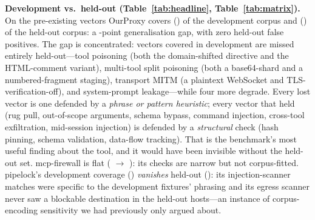 \documentclass[conference]{IEEEtran}
\newcommand{\proxy}{OurProxy}
\newcommand{\rev}{2026-07-28}
\begin{document}
\begin{table}[t]
\caption{Per-vector coverage. E~=~enforce, D~=~detect, --~=~none; the number is the vector's CorpusRobustCoverage in percent. $\Delta$ is held-out minus development for \proxy. $^{\dagger}$Vectors introduced by \rev{} have no held-out set yet (rule~7).}
\label{tab:matrix}
\centering\scriptsize

\end{table}

\textbf{Development vs.\ held-out (Table~\ref{tab:headline}, Table~\ref{tab:matrix}).} On the \nOrig{} pre-existing vectors \proxy{} covers \bastDevOrig{} (\bastDevOrigFrac) of the development corpus and \bastHeldout{} (\bastHeldoutFrac) of the held-out corpus: a \bastGap-point generalisation gap, with zero held-out false positives. The gap is concentrated: \bastLostVectors{} vectors covered in development are missed entirely held-out---tool poisoning (both the domain-shifted directive and the HTML-comment variant), multi-tool split poisoning (both a base64-shard and a numbered-fragment staging), transport MITM (a plaintext WebSocket and TLS-verification-off), and system-prompt leakage---while four more degrade. Every lost vector is one defended by a \emph{phrase or pattern heuristic}; every vector that held (rug pull, out-of-scope arguments, schema bypass, command injection, cross-tool exfiltration, mid-session injection) is defended by a \emph{structural} check (hash pinning, schema validation, data-flow tracking). That is the benchmark's most useful finding about the tool, and it would have been invisible without the held-out set. mcp-firewall is flat (\fwDevOrig{} $\rightarrow$ \fwHeldout): its checks are narrow but not corpus-fitted. pipelock's development coverage (\plDevOrig) \emph{vanishes} held-out (\plHeldout): its injection-scanner matches were specific to the development fixtures' phrasing and its egress scanner never saw a blockable destination in the held-out hosts---an instance of corpus-encoding sensitivity we had previously only argued about.
\end{document}
